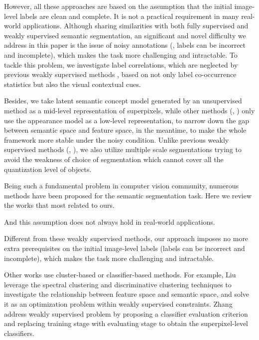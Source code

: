 However, all these approaches are based on the assumption that the initial image-level labels are clean and complete. It is not a practical requirement in many real-world applications. Although sharing similarities with both fully supervised and weakly supervised semantic segmentation, an significant and novel difficulty we address in this paper is the issue of noisy annotations (\eg, labels can be incorrect and incomplete), which makes the task more challenging and intractable. To tackle this problem, we investigate label correlations, which are neglected by previous weakly supervised methods \cite{verbeek2007region,vezhnevets2010towards,vezhnevets2011weakly,vezhnevets2012weakly,xu2014tell}, based on not only label co-occurrence statistics but also the visual contextual cues.

Besides, we take latent semantic concept model generated by an unsupervised method as a mid-level representation of superpixels, while other methods (\eg, \cite{vezhnevets2011weakly,xu2014tell}) only use the appearance model as a low-level representation, to narrow down the gap between semantic space and feature space, in the meantime, to make the whole framework more stable under the noisy condition. Unlike previous weakly supervised methods (\eg, \cite{vezhnevets2012weakly,xu2014tell}), we also utilize multiple scale segmentations trying to avoid the weakness of choice of segmentation which cannot cover all the quantization level of objects.

\if
Being such a fundamental problem in computer vision community, numerous methods have been proposed for the semantic segmentation task. Here we review the works that most related to ours.

And this assumption does not always hold in real-world applications.

Different from these weakly supervised methods, our approach imposes no more extra prerequisites on the initial image-level labels (\eg labels can be incorrect and incomplete), which makes the task more challenging and intractable.

Other works use cluster-based or classifier-based methods. For example, Liu \etal \cite{liu2013weakly} leverage the spectral clustering and discriminative clustering techniques to investigate the relationship between feature space and semantic space, and solve it as an optimization problem within weakly supervised constraints. Zhang \etal \cite{zhang2013sparse} address weakly supervised problem by proposing a classifier evaluation criterion and replacing training stage with evaluating stage to obtain the superpixel-level classifiers.
\fi
